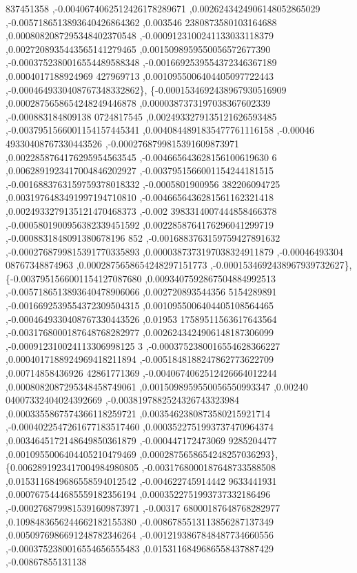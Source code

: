 \begin{DoxyCode}
      837451358 ,-0.0040674062512426178289671 ,0.0026243424906148052865029 ,-0.0057186513893640426864362 ,0.003546
      2380873580103164688 ,0.0008082087295348402370548 ,-0.0009123100241133033118379 ,0.0027208935443565141279465 
      ,0.0015098959550056572677390 ,-0.0003752380016554489588348 ,-0.0016692539554372346367189 ,0.0004017188924969
      427969713 ,0.0010955006404405097722443 ,-0.0004649330408767348332862\},
\{-0.0001534692438967930516909 ,0.0002875658654248249446878 ,0.0000387373197038367602339 ,-0.000883184809138
      0724817545 ,0.0024933279135121626593485 ,-0.0037951566001154157445341 ,0.0040844891835477761116158 ,-0.00046
      49330408767330443526 ,-0.0002768799815391609873971 ,0.0022858764176295954563545 ,-0.004665643628156100619630
      6 ,0.0062891923417004846202927 ,-0.0037951566001154244181515 ,-0.0016883763159759378018332 ,-0.0005801900956
      382206094725 ,0.0031976483491997194710810 ,-0.0046656436281561162321418 ,0.0024933279135121470468373 ,-0.002
      3983314007444858466378 ,-0.0005801900956382339451592 ,0.0022858764176296041299719 ,-0.0008831848091380678196
      852 ,-0.0016883763159759427891632 ,-0.0002768799815391770335893 ,0.0000387373197038324911879 ,-0.00046493304
      08767348874963 ,0.0002875658654248297151773 ,-0.0001534692438967939732627\},
\{-0.0037951566001154127087680 ,0.0093407592867504884992513 ,-0.0057186513893640478906066 ,0.002720893544356
      5154289891 ,-0.0016692539554372309504315 ,0.0010955006404405108564465 ,-0.0004649330408767330443526 ,0.01953
      17589511563617643564 ,-0.0031768000187648768282977 ,0.0026243424906148187306099 ,-0.000912310024113306998125
      3 ,-0.0003752380016554628366227 ,0.0004017188924969418211894 ,-0.0051848188247862773622709 ,0.00714858436926
      42861771369 ,-0.0040674062512426664012244 ,0.0008082087295348458749061 ,0.0015098959550056550993347 ,0.00240
      04007332404024392669 ,-0.0038197882524326743323984 ,0.0003355867574366118259721 ,0.0035462380873580215921714
       ,-0.0004022547261677183517460 ,0.0003522751993737470964374 ,0.0034645172148649850361879 ,-0.000447172473069
      9285204477 ,0.0010955006404405210479469 ,0.0002875658654248257036293\},
\{0.0062891923417004984980805 ,-0.0031768000187648733588508 ,0.0153116849686558594012542 ,-0.004622745914442
      9633441931 ,0.0007675444685559182356194 ,0.0003522751993737332186496 ,-0.0002768799815391609873971 ,-0.00317
      68000187648768282977 ,0.1098483656244662182155380 ,-0.0086785513113856287137349 ,0.0050976986691248782346264
       ,-0.0012193867848487734660556 ,-0.0003752380016554656555483 ,0.0153116849686558437887429 ,-0.00867855131138

\end{DoxyCode}
